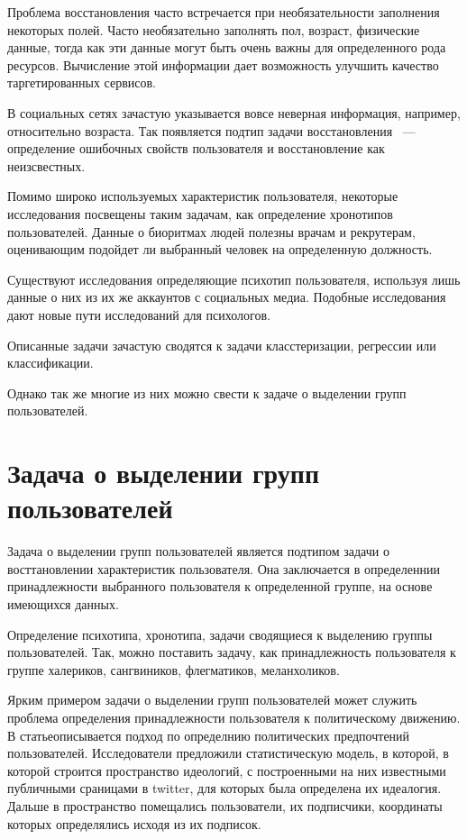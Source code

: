 \documentclass[annotation,times,page4]{itmo-student-thesis}
\begin{document}
Проблема восстановления часто встречается при необязательности заполнения некоторых полей. Часто необязательно заполнять пол, возраст, физические данные, тогда как эти данные могут быть очень важны для определенного рода ресурсов. Вычисление этой информации дает возможность улучшить качество таргетированных сервисов.

В социальных сетях зачастую указывается вовсе неверная информация, например, относительно возраста. Так появляется подтип задачи восстановления ~--- определение ошибочных свойств пользователя и восстановление как неизсвестных.

Помимо широко используемых характеристик пользователя, некоторые исследования посвещены таким задачам, как определение хронотипов пользователей. Данные о биоритмах людей полезны врачам и рекрутерам, оценивающим подойдет ли выбранный человек на определенную должность.

Существуют исследования определяющие психотип пользователя, используя лишь данные о них из их же аккаунтов с социальных медиа. Подобные исследования дают новые пути исследований для психологов.

Описанные задачи зачастую сводятся к задачи класстеризации, регрессии или классификации.

Однако так же многие из них можно свести к задаче о выделении групп пользователей.    

 
\section{Задача о выделении групп пользователей}
Задача о выделении групп пользователей является подтипом задачи о восттановлении характеристик пользователя. Она заключается в определеннии принадлежности выбранного пользователя к определенной группе, на основе имеющихся данных. 

Определение психотипа, хронотипа, задачи сводящиеся к выделению группы пользователей. Так, можно поставить задачу, как принадлежность пользователя к группе халериков, сангвиников, флегматиков, меланхоликов.

Ярким примером задачи о выделении групп пользователей может служить проблема определения принадлежности пользователя к политическому движению. В статьеописывается подход по определнию политических предпочтений пользователей. Исследователи предложили статистическую модель, в которой, в которой строится пространство идеологий, с построенными на них известными публичными сраницами в twitter, для которых была определена их идеалогия. Дальше в пространство помещались пользователи, их подписчики, координаты которых определялись исходя из их подписок.
\end{document}

